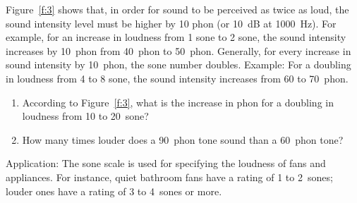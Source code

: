 \documentclass[11pt]{NSF}
\def\ben{\begin{enumerate}}
\def\een{\end{enumerate}}
\begin{document}
Figure~\ref{f:3} shows that, in order for sound to be perceived as twice as
loud, the sound intensity level must be higher by 10 phon (or 10~dB at
1000~Hz).
For example, for an increase in loudness from 1 sone to 2 sone, the 
sound intensity increases by 10~phon from 40~phon to 50~phon. 
Generally, for every increase in sound intensity by 10~phon, the sone 
number doubles. 
Example: For a doubling in loudness from 4 to 8 sone, the sound intensity 
increases from 60 to 70~phon.

\ben
\item
According to Figure~\ref{f:3}, what is the increase in phon for a 
doubling in loudness from 10 to 20~sone?

\item
How many times louder does a 90~phon tone sound than a 60~phon tone?

\een

Application:
The sone scale is used for specifying the loudness of fans and
appliances. For instance, quiet bathroom fans have a rating of 1 to 
2~sones; louder ones have a rating of 3 to 4~sones or more.
\end{document}
